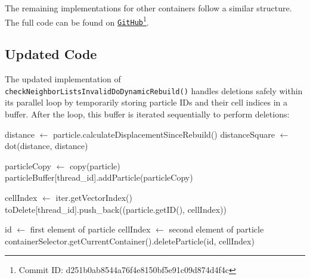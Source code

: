 
The remaining implementations for other containers follow a similar structure. The full code can be found on \href{https://github.com/AutoPas/AutoPas/commit/d251b0ab8544a76f4e8150bf5e91c09d874d4f4c}{\texttt{GitHub}}\footnote{Commit ID: d251b0ab8544a76f4e8150bf5e91c09d874d4f4c}. 

\subsection{Updated Code}

The updated implementation of \texttt{checkNeighborListsInvalidDoDynamicRebuild()} handles deletions safely within its parallel loop by temporarily storing particle IDs and their cell indices in a buffer. After the loop, this buffer is iterated sequentially to perform deletions:

\begin{algorithm}
\label{alg:neighborlists}
\begin{algorithmic}[1]
     

      \State 
      \State distance $\gets$ particle.calculateDisplacementSinceRebuild()
      \State distanceSquare $\gets$ dot(distance, distance) 

      \State 
          \State 
          \State particleCopy $\gets$ copy(particle)
          \State particleBuffer[thread\_id].addParticle(particleCopy)

          \State cellIndex $\gets$ iter.getVectorIndex()
          \State toDelete[thread\_id].push\_back((particle.getID(), cellIndex))
          
      \State 
      \EndIf
    \EndFor

    \State 

            \State id $\gets$ first element of particle
            \State cellIndex $\gets$ second element of particle
            \State containerSelector.getCurrentContainer().deleteParticle(id, cellIndex)
        \EndFor
    \EndFor

\EndProcedure
\end{algorithmic}
\end{algorithm}


